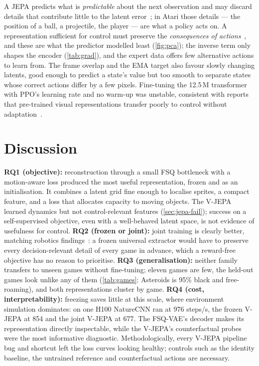 \documentclass[runningheads]{llncs}
\begin{document}
A JEPA predicts what is \emph{predictable} about the next observation and may discard details
that contribute little to the latent error~\cite{lecun2022path,assran2023ijepa}; in Atari those
details --- the position of a ball, a projectile, the player --- are what a policy acts on. A
representation sufficient for control must preserve the \emph{consequences of
actions}~\cite{gelada2019deepmdp,zhang2021dbc}, and these are what the predictor modelled least
(\cref{fig:pca}); the inverse term only shapes the encoder (\cref{tab:grad}), and the expert data
offers few alternative actions to learn from. The frame overlap and the EMA target also favour
slowly changing latents, good enough to predict a state's value but too smooth to separate
states whose correct actions differ by a few pixels. Fine-tuning the 12.5\,M transformer with
PPO's learning rate and no warm-up was unstable, consistent with reports that pre-trained visual
representations transfer poorly to control without adaptation~\cite{hansen2022pretrained,parisi2022pvr}.

\FloatBarrier
\section{Discussion}
\label{sec:discussion}

\textbf{RQ1 (objective):} reconstruction through a small FSQ bottleneck with a motion-aware
loss produced the most useful representation, frozen and as an initialisation. It combines a
latent grid fine enough to localise sprites, a compact feature, and a loss that allocates
capacity to moving objects. The V-JEPA learned dynamics but not control-relevant features
(\cref{sec:jepa-fail}); success on a self-supervised objective, even with a well-behaved
latent space, is not evidence of usefulness for control. \textbf{RQ2 (frozen or joint):}
joint training is clearly better, matching robotics findings~\cite{hansen2022pretrained}: a
frozen universal extractor would have to preserve every decision-relevant detail of every
game in advance, which a reward-free objective has no reason to prioritise. \textbf{RQ3
(generalisation):} neither family transfers to unseen games without fine-tuning; eleven games
are few, the held-out games look unlike any of them (\cref{tab:games}: Asteroids is 95\% black
and free-roaming), and both representations cluster by game. \textbf{RQ4 (cost,
interpretability):} freezing saves little at this scale, where environment simulation dominates:
on one H100 NatureCNN ran at 976 steps/s, the frozen V-JEPA at 854 and the joint V-JEPA at 677.
The FSQ-VAE's decoder makes its representation directly inspectable, while the V-JEPA's
counterfactual probes were the most informative diagnostic. Methodologically, every V-JEPA pipeline bug and shortcut left the loss curves
looking healthy; controls such as the identity baseline, the untrained reference and
counterfactual actions are necessary.
\end{document}
